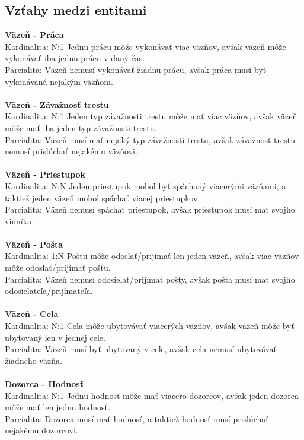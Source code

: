 \documentclass[slovak, 12pt, Times New Roman]{article}
\begin{document}
		\subsection{Vzťahy medzi entitami}
			\textbf{Väzeň - Práca} \\
				Kardinalita: N:1 Jednu prácu môže vykonávať viac väzňov, avšak väzeň môže vykonávať iba jednu prácu v daný čas.\\
				Parcialita: Väzeň nemusí vykonávať žiadnu prácu, avšak práca musí byť vykonávaná nejakým väzňom.\\ \\
			\textbf{Väzeň - Závažnosť trestu} \\
				Kardinalita: N:1 Jeden typ závažnosti trestu môže mať viac väzňov, avšak väzeň môže mať iba jeden typ závažnosti trestu. \\
				Parcialita: Väzeň musí mať nejaký typ závažnosti trestu, avšak závažnosť trestu nemusí prislúchať nejakému väzňovi.\\ \\
			\textbf{Väzeň - Priestupok} \\
				Kardinalita: N:N Jeden priestupok mohol byť spáchaný viacerými väzňami, a taktiež jeden väzeň mohol spáchať viacej priestupkov.
				\\
				Parcialita: Väzeň nemusí spáchať priestupok, avšak priestupok musí mať svojho vinníka.\\ \\
			\textbf{Väzeň - Pošta} \\
				Kardinalita: 1:N Poštu môže odoslať/prijímať len jeden väzeň, avšak viac väzňov môže odoslať/prijímať poštu.\\
				Parcialita: Väzeň nemusí odosielať/prijímať pošty, avšak pošta musí mať svojho odosielateľa/prijímateľa.\\ \\
			\textbf{Väzeň - Cela} \\
				Kardinalita: N:1 Cela môže ubytovávať viacerých väzňov, avšak väzeň môže byť ubytovaný len v jednej cele. \\
				Parcialita: Väzeň musí byť ubytovaný v cele, avšak cela nemusí ubytovávať žiadneho väzňa.\\ \\
			\textbf{Dozorca - Hodnosť} \\
				Kardinalita: N:1 Jednu hodnosť môže mať viacero dozorcov, avšak jeden dozorca môže mať len jednu hodnosť.\\
				Parcialita: Dozorca musí mať hodnosť, a taktiež hodnosť musí prislúchať nejakému dozorcovi.\\ \\
\end{document}
